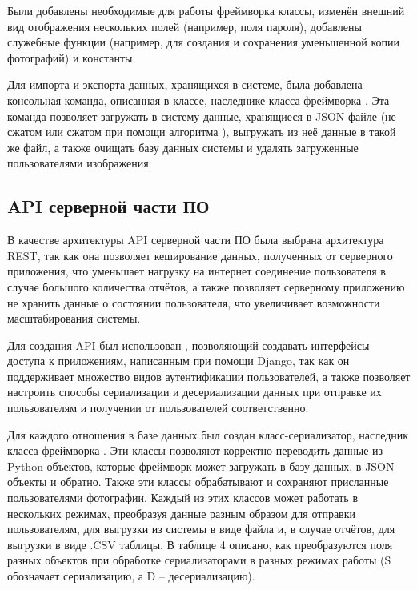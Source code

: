 \tab
Были добавлены необходимые для работы фреймворка  классы, изменён внешний вид отображения нескольких полей (например, поля пароля), добавлены служебные функции (например, для создания и сохранения уменьшенной копии фотографий) и константы.

\tab
Для импорта и экспорта данных, хранящихся в системе, была добавлена консольная команда, описанная в классе, наследнике класса  фреймворка .
Эта команда позволяет загружать в систему данные, хранящиеся в JSON файле (не сжатом или сжатом при помощи алгоритма ), выгружать из неё данные в такой же файл, а также очищать базу данных системы и удалять загруженные пользователями изображения.

\subsection{API серверной части ПО}

\tab
В качестве архитектуры API серверной части ПО была выбрана архитектура REST\cite{???}, так как она позволяет кеширование данных, полученных от серверного приложения, что уменьшает нагрузку на интернет соединение пользователя в случае большого количества отчётов, а также позволяет серверному приложению не хранить данные о состоянии пользователя, что увеличивает возможности масштабирования системы.

\tab
Для создания API был использован , позволяющий создавать интерфейсы доступа к приложениям, написанным при помощи Django, так как он поддерживает множество видов аутентификации пользователей, а также позволяет настроить способы сериализации и десериализации данных при отправке их пользователям и получении от пользователей соответственно.

\tab
Для каждого отношения в базе данных был создан класс-сериализатор, наследник класса  фреймворка .
Эти классы позволяют корректно переводить данные из Python объектов, которые фреймворк  может загружать в базу данных, в JSON объекты и обратно.
Также эти классы обрабатывают и сохраняют присланные пользователями фотографии.
Каждый из этих классов может работать в нескольких режимах, преобразуя данные разным образом для отправки пользователям, для выгрузки из системы в виде файла и, в случае отчётов, для выгрузки в виде .CSV таблицы.
В таблице 4 описано, как преобразуются поля разных объектов при обработке сериализаторами в разных режимах работы (S обозначает сериализацию, а D -- десериализацию).
\tablefour

